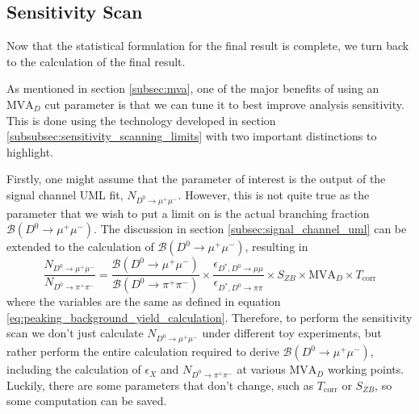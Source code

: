 \subsection{Sensitivity Scan}
\label{subsec:sensitivity_scan}

Now that the statistical formulation for the final result is complete, we turn back to the calculation of the final result. 

As mentioned in section \ref{subsec:mva}, one of the major benefits of using an $\text{MVA}_D$ cut parameter is that we can tune it to best improve analysis sensitivity. This is done using the technology developed in section \ref{subsubsec:sensitivity_scanning_limits} with two important distinctions to highlight.

Firstly, one might assume that the parameter of interest is the output of the signal channel UML fit, $N_{D^0 \to \mu^+ \mu^-}$. However, this is not quite true as the parameter that we wish to put a limit on is the actual branching fraction $\mathcal{B}(D^0 \to \mu^+ \mu^-)$. The discussion in section \ref{subsec:signal_channel_uml} can be extended to the calculation of $\mathcal{B}(D^0 \to \mu^+ \mu^-)$, resulting in 
\begin{equation}
    \frac{N_{D^0 \to \mu^+  \mu^-}}{N_{D^0 \to \pi^+ \pi^-}} = \frac{\mathcal{B}(D^0 \to \mu^+ \mu^-)}{\mathcal{B}(D^0 \to \pi^+ \pi^-)}\times \frac{\epsilon_{D^*, D^0\to\mu\mu}}{\epsilon_{D^*, D^0\to\pi\pi}} \times S_{ZB} \times \text{MVA}_D \times T_{\text{corr}} 
\end{equation}
where the variables are the same as defined in equation \ref{eq:peaking_background_yield_calculation}. Therefore, to perform the sensitivity scan we don't just calculate $N_{D^0 \to \mu^+ \mu^-}$ under different toy experiments, but rather perform the entire calculation required to derive $\mathcal{B}(D^0 \to \mu^+ \mu^-)$, including the calculation of $\epsilon_X$ and $N_{D^0 \to \pi^+ \pi^-}$ at various $\text{MVA}_D$ working points. Luckily, there are some parameters that don't change, such as $T_{\text{corr}}$ or $S_{ZB}$, so some computation can be saved.

